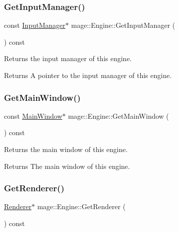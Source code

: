 \subsubsection{\texorpdfstring{Get\+Input\+Manager()}{GetInputManager()}}
{\footnotesize\ttfamily const \hyperlink{classmage_1_1_input_manager}{Input\+Manager}$\ast$ mage\+::\+Engine\+::\+Get\+Input\+Manager (\begin{DoxyParamCaption}{ }\end{DoxyParamCaption}) const}

Returns the input manager of this engine.

\begin{DoxyReturn}{Returns}
A pointer to the input manager of this engine. 
\end{DoxyReturn}
\hypertarget{classmage_1_1_engine_a28baaa54158acac8ffca3b6f31f63f82}{}\label{classmage_1_1_engine_a28baaa54158acac8ffca3b6f31f63f82} 
\subsubsection{\texorpdfstring{Get\+Main\+Window()}{GetMainWindow()}}
{\footnotesize\ttfamily const \hyperlink{classmage_1_1_main_window}{Main\+Window}$\ast$ mage\+::\+Engine\+::\+Get\+Main\+Window (\begin{DoxyParamCaption}{ }\end{DoxyParamCaption}) const}

Returns the main window of this engine.

\begin{DoxyReturn}{Returns}
The main window of this engine. 
\end{DoxyReturn}
\hypertarget{classmage_1_1_engine_a45a5005c7072937cb54a3f2f6431c66c}{}\label{classmage_1_1_engine_a45a5005c7072937cb54a3f2f6431c66c} 
\subsubsection{\texorpdfstring{Get\+Renderer()}{GetRenderer()}}
{\footnotesize\ttfamily \hyperlink{classmage_1_1_renderer}{Renderer}$\ast$ mage\+::\+Engine\+::\+Get\+Renderer (\begin{DoxyParamCaption}{ }\end{DoxyParamCaption}) const}


